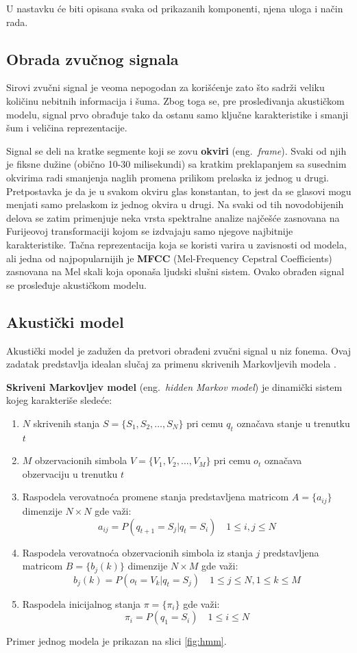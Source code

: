 \documentclass[a4paper]{article}
\begin{document}
U nastavku će biti opisana svaka od prikazanih komponenti, njena uloga i način rada.

\subsection{Obrada zvučnog signala}
\label{sec:obrada}
Sirovi zvučni signal je veoma nepogodan za korišćenje zato što sadrži veliku količinu nebitnih informacija i šuma.
Zbog toga se, pre prosleđivanja akustičkom modelu, signal prvo obrađuje tako da ostanu samo ključne karakteristike i smanji šum i veličina reprezentacije.

Signal se deli na kratke segmente koji se zovu \textbf{okviri} (eng.~{\em frame}).
Svaki od njih je fiksne dužine (obično 10-30 milisekundi) sa kratkim preklapanjem sa susednim okvirima radi smanjenja naglih promena prilikom prelaska iz jednog u drugi.
Pretpostavka je da je u svakom okviru glas konstantan, to jest da se glasovi mogu menjati samo prelaskom iz jednog okvira u drugi.
Na svaki od tih novodobijenih delova se zatim primenjuje neka vrsta spektralne analize najčešće zasnovana na Furijeovoj transformaciji kojom se izdvajaju samo njegove najbitnije karakteristike.
Tačna reprezentacija koja se koristi varira u zavisnosti od modela, ali jedna od najpopularnijih je \textbf{MFCC} (Mel-Frequency Cepstral Coefficients) \cite{dave2013feature} zasnovana na Mel skali koja oponaša ljudski slušni sistem.
Ovako obrađen signal se prosleđuje akustičkom modelu.

\subsection{Akustički model}
Akustički model je zadužen da pretvori obrađeni zvučni signal u niz fonema. 
Ovaj zadatak predstavlja idealan slučaj za primenu skrivenih Markovljevih modela \cite{rabiner1989hmm}.

\textbf{Skriveni Markovljev model} (eng.~{\em hidden Markov model}) je dinamički sistem kojeg karakteriše sledeće:
\begin{enumerate}
  \item $N$ skrivenih stanja $S = \{S_1, S_2, \dots, S_N\}$ pri cemu $q_t$ označava stanje u trenutku $t$
  \item $M$ obzervacionih simbola $V = \{V_1, V_2, \dots, V_M\}$ pri cemu $o_t$ označava obzervaciju u trenutku $t$
  \item Raspodela verovatnoća promene stanja predstavljena matricom $A=\{a_{ij}\}$ dimenzije $N \times N$ gde važi: $$a_{ij} = P(q_{t+1} = S_j | q_{t} = S_i) \quad 1 \leq i,j \leq N$$
  \item Raspodela verovatnoća obzervacionih simbola iz stanja $j$ predstavljena matricom $B=\{b_j(k)\}$ dimenzije $N \times M$ gde važi: $$b_j(k) = P(o_t = V_k | q_t = S_j) \quad 1 \leq j \leq N, 1 \leq k \leq M$$
  \item Raspodela inicijalnog stanja $\pi=\{\pi_i\}$ gde važi: $$\pi_i = P(q_1 = S_i) \quad 1 \leq i \leq N$$
\end{enumerate}
Primer jednog modela je prikazan na slici \ref{fig:hmm}.
\end{document}
